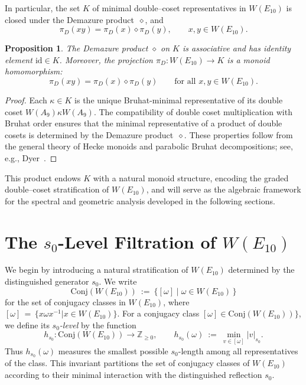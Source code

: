 \documentclass[11pt]{amsart}
\numberwithin{equation}{section}
\newcommand{\conW}{\mathrm{Conj}(W(E_{10}))}
\newtheorem{prop}[thm]{Proposition}
\begin{document}
In particular, the set \(K\) of minimal double--coset
representatives in \(W(E_{10})\) is closed under the Demazure product~$\diamond$, and
\[
\pi_D(xy) = \pi_D(x) \diamond \pi_D(y),
\qquad x, y \in W(E_{10}).
\]

\begin{prop}\label{P:Demazure}
The Demazure product \(\diamond\) on \(K\) is associative and has identity element \(\mathrm{id} \in K\).
Moreover, the projection \(\pi_D : W(E_{10}) \to K\) is a monoid homomorphism:
\[
\pi_D(xy) = \pi_D(x) \diamond \pi_D(y) \qquad \text{for all } x, y \in W(E_{10}).
\]
\end{prop}

\begin{proof}
Each \(\kappa \in K\) is the unique Bruhat-minimal representative of its double coset \(W(A_9)\kappa W(A_9)\).
The compatibility of double coset multiplication with Bruhat order ensures that the minimal representative of a product of double cosets is determined by the Demazure product~$\diamond$.
These properties follow from the general theory of Hecke monoids and parabolic Bruhat decompositions; see, e.g., Dyer~\cite[Thm.~2.4]{Dyer1991}.
\end{proof}

\medskip
This product endows \(K\) with a natural monoid structure, encoding the
graded double--coset stratification of \(W(E_{10})\), and will serve as
the algebraic framework for the spectral and geometric analysis developed
in the following sections.



\section{The $s_0$-Level Filtration of $W(E_{10})$}\label{S:Ktree}
We begin by introducing a natural stratification of $W(E_{10})$ determined by the distinguished generator $s_0$.   We write
 \[ \conW\ :=\ \{ [\omega] \mid \omega \in W(E_{10})\, \}\] for the set of conjugacy classes in $W(E_{10})$, where $[\omega] \,=\,\{ x \omega x^{-1} | x \in W(E_{10})\}$. For a conjugacy class $[\omega] \in \conW\}$, we define its \emph{$s_0$-level}  by the function 
 \[ h_{s_0} : \conW \longrightarrow \mathbb{Z}_{\ge 0}, \qquad  h_{s_0} (\omega) \ :=\ \min_{v \in [\omega]} |v|_{s_0}.\] Thus $h_{s_0}(\omega)$ measures the smallest possible $s_0$-length among all representatives of the class. This invariant partitions the set of conjugacy classes of $W(E_{10})$ according to their minimal interaction with the distinguished reflection $s_0$. 
 
\end{document}
